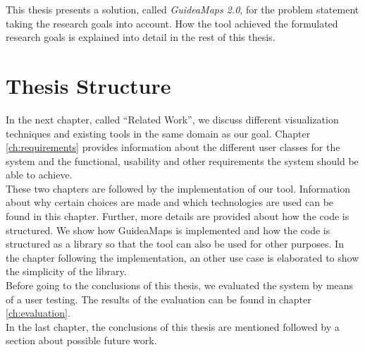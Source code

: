 This thesis presents a solution, called \textit{GuideaMaps 2.0}, for the problem statement taking the research goals into account. How the tool achieved the formulated research goals is explained into detail in the rest of this thesis.\\




\section{Thesis Structure}\label{sec:thesis-structure}
In the next chapter, called ``Related Work'', we discuss different visualization techniques and existing tools in the same domain as our goal. Chapter \ref{ch:requirements} provides information about the different user classes for the system and the functional, usability and other requirements the system should be able to achieve.\\

These two chapters are followed by the implementation of our tool. Information about why certain choices are made and which technologies are used can be found in this chapter. Further, more details are provided about how the code is structured. We show how GuideaMaps is implemented and how the code is structured as a library so that the tool can also be used for other purposes. In the chapter following the implementation, an other use case is elaborated to show the simplicity of the library.\\

Before going to the conclusions of this thesis, we evaluated the system by means of a user testing. The results of the evaluation can be found in chapter \ref{ch:evaluation}.\\

In the last chapter, the conclusions of this thesis are mentioned followed by a section about possible future work.



